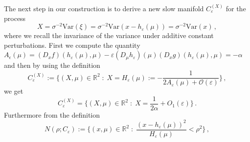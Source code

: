 \documentclass[../main.tex]{subfiles}
\begin{document}
\begin{example}[label=ex3.3]{}{}
The next step in our construction is to derive a new slow manifold $C_{\varepsilon}^{(X)}$ for the process 
\begin{equation*}
             X=\sigma^{-2}\text{Var}(\xi)=\sigma^{-2}\text{Var}(x - h_{\varepsilon}(\mu))=\sigma^{-2}\text{Var}(x)\,,
\end{equation*}
where we recall the invariance of the variance under additive constant perturbations.
First we compute the quantity $A_{\epsilon}(\mu)=(D_x f)(h_{\varepsilon}(\mu),\mu) - \varepsilon (D_{\mu} h_{\varepsilon})(\mu) (D_x g)(h_{\varepsilon}(\mu),\mu)=-\alpha$ and then by using the definition
\begin{equation*}
     C_{\varepsilon}^{(X)}:=\bigg\{(X,\mu)\in \mathbb{R}^2\;:\;X=H_{\varepsilon}(\mu):=- \frac{1}{2A_{\varepsilon}(\mu)+\mathcal{O}(\varepsilon)}\bigg\}\,,
\end{equation*}
we get
\begin{equation*}
     C_{\varepsilon}^{(X)}=\{(X,\mu)\in \mathbb{R}^{2}\;:\;X=\frac{1}{2 \alpha}+O_{1}(\varepsilon)\}\,.
\end{equation*}
Furthermore from the definition
\begin{equation*}
     N(\rho;C_{\varepsilon}):=\bigg\{(x,\mu)\in \mathbb{R}^{2}\;:\;\frac{(x-h_{\varepsilon}(\mu))^{2}}{H_{\varepsilon}(\mu)}<\rho^2\bigg\}\,,
\end{equation*}
\end{example}
\end{document}
